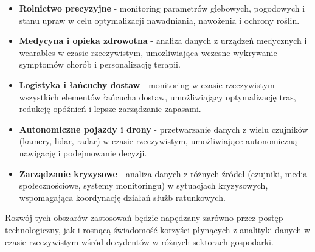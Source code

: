 \begin{itemize}
    \item \textbf{Rolnictwo precyzyjne} - monitoring parametrów glebowych, pogodowych i stanu upraw w celu optymalizacji nawadniania, nawożenia i ochrony roślin.
    \item \textbf{Medycyna i opieka zdrowotna} - analiza danych z urządzeń medycznych i wearables w czasie rzeczywistym, umożliwiająca wczesne wykrywanie symptomów chorób i personalizację terapii.
    \item \textbf{Logistyka i łańcuchy dostaw} - monitoring w czasie rzeczywistym wszystkich elementów łańcucha dostaw, umożliwiający optymalizację tras, redukcję opóźnień i lepsze zarządzanie zapasami.
    \item \textbf{Autonomiczne pojazdy i drony} - przetwarzanie danych z wielu czujników (kamery, lidar, radar) w czasie rzeczywistym, umożliwiające autonomiczną nawigację i podejmowanie decyzji.
    \item \textbf{Zarządzanie kryzysowe} - analiza danych z różnych źródeł (czujniki, media społecznościowe, systemy monitoringu) w sytuacjach kryzysowych, wspomagająca koordynację działań służb ratunkowych.
\end{itemize}

Rozwój tych obszarów zastosowań będzie napędzany zarówno przez postęp technologiczny, jak i rosnącą świadomość korzyści płynących z analityki danych w czasie rzeczywistym wśród decydentów w różnych sektorach gospodarki. 